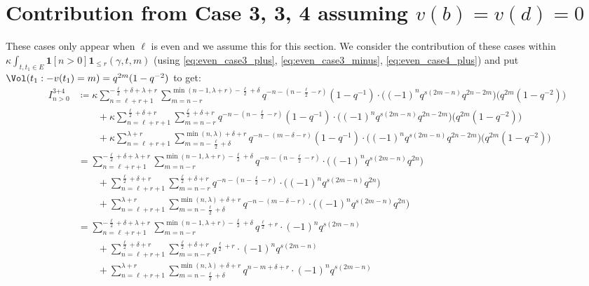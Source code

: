 \section{Contribution from Case 3\ts{+}, 3\ts{-}, 4\ts{+} assuming $v(b) = v(d) = 0$}
These cases only appear when $\ell$ is even and we assume this for this section.
We consider the contribution of these cases within
$\kappa \int_{t, t_1 \in E} \mathbf{1}[n > 0] \mathbf{1}_{\le r}(\gamma,t,m)$
(using \eqref{eq:even_case3_plus}, \eqref{eq:even_case3_minus}, \eqref{eq:even_case4_plus})
and put $\Vol(t_1:-v(t_1)=m) = q^{2m} (1-q^{-2})$ to get:
\begin{align*}
  I_{n > 0}^{\text{3+4}}
  &\coloneqq \kappa \sum_{n=\ell+r+1}^{-\frac{\ell}{2}+\delta+\lambda+r}
    \sum_{m=n-r}^{\min(n-1, \lambda+r)-\frac{\ell}{2}+\delta}
    q^{-n-(n-\frac{\ell}{2}-r)} \left( 1 - q^{-1} \right)
      \cdot \Big( (-1)^n q^{s(2m-n)} q^{2n-2m} \Big) \Big( q^{2m}(1-q^{-2}) \Big) \\
  &\qquad+ \kappa \sum_{n=\ell+r+1}^{\frac{\ell}{2}+\delta+r}
    \sum_{m=n-r}^{\frac{\ell}{2}+\delta+r}
    q^{-n-(n-\frac{\ell}{2}-r)} \left( 1 - q^{-1} \right)
      \cdot \Big( (-1)^n q^{s(2m-n)} q^{2n-2m} \Big) \Big( q^{2m}(1-q^{-2}) \Big) \\
  &\qquad+ \kappa \sum_{n=\ell+r+1}^{\lambda+r}
    \sum_{m=n-\frac{\ell}{2}+\delta}^{\min(n,\lambda)+\delta+r}
    q^{-n-(m-\delta-r)} \left( 1 - q^{-1} \right)
      \cdot \Big( (-1)^n q^{s(2m-n)} q^{2n-2m} \Big) \Big( q^{2m}(1-q^{-2}) \Big) \\
  &= \sum_{n=\ell+r+1}^{-\frac{\ell}{2}+\delta+\lambda+r}
    \sum_{m=n-r}^{\min(n-1, \lambda+r)-\frac{\ell}{2}+\delta}
    q^{-n-(n-\frac{\ell}{2}-r)}
      \cdot \Big( (-1)^n q^{s(2m-n)} q^{2n} \Big) \\
  &\qquad+ \sum_{n=\ell+r+1}^{\frac{\ell}{2}+\delta+r}
    \sum_{m=n-r}^{\frac{\ell}{2}+\delta+r}
    q^{-n-(n-\frac{\ell}{2}-r)}
      \cdot \Big( (-1)^n q^{s(2m-n)} q^{2n} \Big) \\
  &\qquad+ \sum_{n=\ell+r+1}^{\lambda+r}
    \sum_{m=n-\frac{\ell}{2}+\delta}^{\min(n,\lambda)+\delta+r}
    q^{-n-(m-\delta-r)}
      \cdot \Big( (-1)^n q^{s(2m-n)} q^{2n} \Big) \\
  &= \sum_{n=\ell+r+1}^{-\frac{\ell}{2}+\delta+\lambda+r}
    \sum_{m=n-r}^{\min(n-1, \lambda+r)-\frac{\ell}{2}+\delta}
    q^{\frac{\ell}{2}+r} \cdot (-1)^n q^{s(2m-n)} \\
  &\qquad+ \sum_{n=\ell+r+1}^{\frac{\ell}{2}+\delta+r}
    \sum_{m=n-r}^{\frac{\ell}{2}+\delta+r}
    q^{\frac{\ell}{2}+r} \cdot (-1)^n q^{s(2m-n)} \\
  &\qquad+ \sum_{n=\ell+r+1}^{\lambda+r}
    \sum_{m=n-\frac{\ell}{2}+\delta}^{\min(n,\lambda)+\delta+r}
    q^{n-m+\delta+r} \cdot (-1)^n q^{s(2m-n)} \\
\end{align*}

